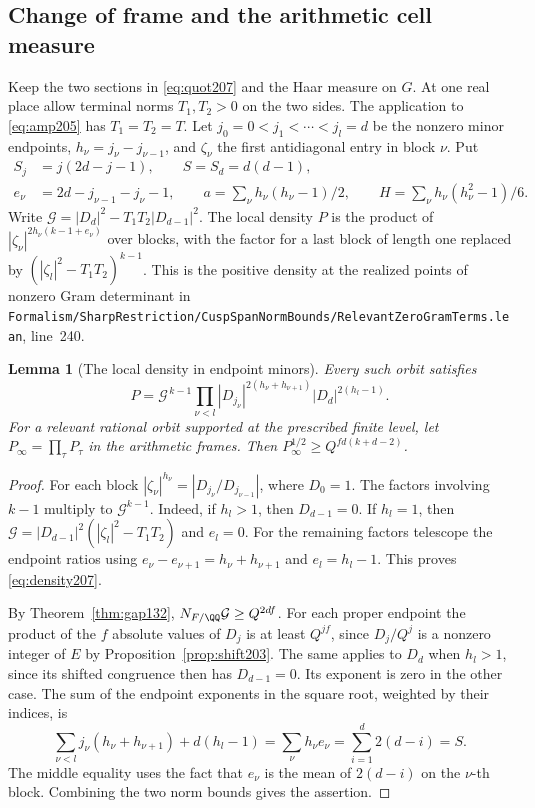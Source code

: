 \documentclass[a4paper,11pt]{article}
\newtheorem{lemma}[proposition]{Lemma}
\theoremstyle{definition}
\theoremstyle{remark}
\newcommand{\srcloc}[2]{{\small\nolinkurl{#1.lean}}, line~#2}
\numberwithin{equation}{section}
\begin{document}
\subsection{Change of frame and the arithmetic cell measure}\label{nav:IX-04}
\label{sec:frames207}

Keep the two sections in \eqref{eq:quot207} and the Haar measure
on \(G\). At one real place allow terminal norms \(T_1,T_2>0\)
on the two sides. The application to \eqref{eq:amp205} has
\(T_1=T_2=T\). Let \(j_0=0<j_1<\cdots<j_l=d\) be the nonzero
minor endpoints, \(h_\nu=j_\nu-j_{\nu-1}\), and \(\zeta_\nu\)
the first antidiagonal entry in block \(\nu\). Put
\[
 \begin{split}
 S_j&=j(2d-j-1),\qquad S=S_d=d(d-1),\\
 e_\nu&=2d-j_{\nu-1}-j_\nu-1,\qquad
 a=\sum_\nu h_\nu(h_\nu-1)/2,\qquad
 H=\sum_\nu h_\nu(h_\nu^2-1)/6 .
 \end{split}
\]
Write \(\mathcal G=|D_d|^2-T_1T_2|D_{d-1}|^2\).
The local density \(P\) is the product of
\(|\zeta_\nu|^{2h_\nu(k-1+e_\nu)}\) over blocks, with the factor
for a last block of length one replaced by
\((|\zeta_l|^2-T_1T_2)^{k-1}\). This is the positive density at
the realized points of nonzero Gram determinant in
\srcloc{Formalism/SharpRestriction/CuspSpanNormBounds/RelevantZeroGramTerms}{240}.

\begin{lemma}[The local density in endpoint minors]\label{lem:density207}
Every such orbit satisfies
\begin{equation}
 P=\mathcal G^{\,k-1}
       \prod_{\nu<l}|D_{j_\nu}|^{2(h_\nu+h_{\nu+1})}
                         |D_d|^{2(h_l-1)}.              \label{eq:density207}
\end{equation}
For a relevant rational orbit supported at the prescribed finite
level, let \(P_\infty=\prod_{\tau}P_\tau\) in the arithmetic
frames. Then \(P_\infty^{1/2}\ge Q^{fd(k+d-2)}\).
\end{lemma}
\begin{proof}
For each block \(|\zeta_\nu|^{h_\nu}=|D_{j_\nu}/D_{j_{\nu-1}}|\),
where \(D_0=1\). The factors involving \(k-1\) multiply to
\(\mathcal G^{k-1}\). Indeed, if \(h_l>1\), then \(D_{d-1}=0\).
If \(h_l=1\), then \(\mathcal G=|D_{d-1}|^2
(|\zeta_l|^2-T_1T_2)\) and \(e_l=0\).
For the remaining factors telescope the endpoint ratios using
\(e_\nu-e_{\nu+1}=h_\nu+h_{\nu+1}\) and \(e_l=h_l-1\).
This proves \eqref{eq:density207}.

By Theorem~\ref{thm:gap132}, \(N_{F/\QQ}\mathcal G\ge Q^{2df}\).
For each proper endpoint the product of the \(f\) absolute values
of \(D_j\) is at least \(Q^{jf}\), since \(D_j/Q^j\) is a
nonzero integer of \(E\) by Proposition~\ref{prop:shift203}.
The same applies to \(D_d\) when \(h_l>1\), since its shifted
congruence then has \(D_{d-1}=0\). Its exponent is zero in the
other case. The sum of the endpoint exponents in the square root,
weighted by their indices, is
\[
 \sum_{\nu<l}j_\nu(h_\nu+h_{\nu+1})+d(h_l-1)
       =\sum_\nu h_\nu e_\nu=\sum_{i=1}^d 2(d-i)=S .
\]
The middle equality uses the fact that \(e_\nu\) is the mean of
\(2(d-i)\) on the \(\nu\)-th block. Combining the two norm
bounds gives the assertion.
\end{proof}
\end{document}
